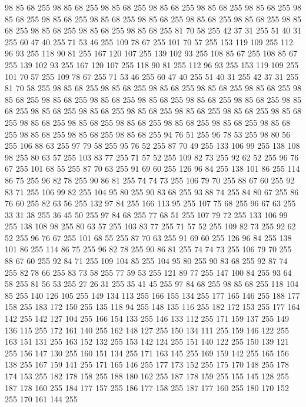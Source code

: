 98 85 68 255 98 85 68 255 98 85 68 255 98 85 68 255 98 85 68 255 98 85 68 255 98 85 68 255 98 85 68 255 98 85 68 255 98 85 68 255 98 85 68 255 98 85 68 255 98 85 68 255 98 85 68 255 98 85 68 255 98 85 68 255 81 70 58 255 42 37 31 255 51 40 31 255 60 47 40 255 71 53 46 255 109 78 67 255 101 70 57 255 153 119 109 255 112 96 93 255 118 90 81 255 167 120 107 255 139 102 93 255 108 85 67 255 108 85 67 255 139 102 93 255 167 120 107 255 118 90 81 255 112 96 93 255 153 119 109 255 101 70 57 255 109 78 67 255 71 53 46 255 60 47 40 255 51 40 31 255 42 37 31 255 81 70 58 255 98 85 68 255 98 85 68 255 98 85 68 255 98 85 68 255 98 85 68 255 98 85 68 255 98 85 68 255 98 85 68 255 98 85 68 255 98 85 68 255 98 85 68 255 98 85 68 255 98 85 68 255 98 85 68 255 98 85 68 255 98 85 68 255 98 85 68 255 98 85 68 255 98 85 68 255 98 85 68 255 98 85 68 255 98 85 68 255
98 85 68 255 98 85 68 255 98 85 68 255 98 85 68 255 98 85 68 255 94 76 51 255 96 78 53 255 98 80 56 255 106 88 63 255 97 79 58 255 95 76 52 255 87 70 49 255 133 106 99 255 138 108 98 255 80 63 57 255 103 83 77 255 71 57 52 255 109 82 73 255 92 62 52 255 96 76 67 255 101 68 55 255 87 70 63 255 91 69 60 255 126 96 84 255 138 101 86 255 114 86 75 255 96 82 78 255 90 86 81 255 74 74 73 255 106 79 70 255 88 67 60 255 92 83 71 255 106 99 82 255 104 95 80 255 90 83 68 255 93 88 74 255 84 80 67 255 86 76 60 255 82 63 56 255 132 97 84 255 166 113 95 255 107 75 68 255 96 67 63 255 33 31 38 255 36 45 50 255 97 84 68 255 77 68 51 255 107 79 72 255 133 106 99 255 138 108 98 255 80 63 57 255 103 83 77 255 71 57 52 255 109 82 73 255 92 62 52 255 96 76 67 255 101 68 55 255 87 70 63 255 91 69 60 255 126 96 84 255 138 101 86 255 114 86 75 255 96 82 78 255 90 86 81 255
74 74 73 255 106 79 70 255 88 67 60 255 92 84 71 255 109 104 85 255 104 95 80 255 90 83 68 255 92 87 74 255 82 78 66 255 83 73 58 255 77 59 53 255 121 89 77 255 147 100 84 255 93 64 58 255 81 56 53 255 27 26 31 255 35 41 45 255 97 84 68 255 98 85 68 255 118 104 85 255 140 126 105 255 149 134 113 255 166 155 134 255 177 165 146 255 188 177 158 255 183 172 150 255 135 118 94 255 148 135 116 255 182 172 153 255 177 164 142 255 142 127 104 255 166 154 133 255 146 133 112 255 171 159 137 255 149 136 115 255 172 161 140 255 162 148 127 255 150 134 111 255 159 146 122 255 163 151 131 255 163 152 132 255 153 142 124 255 151 140 122 255 150 139 121 255 156 147 130 255 160 151 134 255 171 163 145 255 169 159 142 255 165 156 138 255 167 159 141 255 171 165 146 255 177 173 152 255 175 170 148 255 178 174 153 255 182 178 158 255 188 180 162 255 187 178 159 255 155 145 128 255 187 178 160 255 184 177 157 255 186 177 158 255 187 177 160 255 180 170 152 255 170 161 144 255
